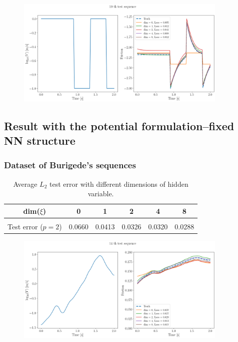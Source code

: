 \begin{figure}[H]
    \centering
    \includegraphics[width=0.9\textwidth]{images/FGJump2.png}
    \label{fig:FGJump2}
\end{figure}

\newpage
\subsection{Result with the potential formulation--fixed NN structure}
\subsubsection{Dataset of Burigede's sequences}
\begin{table}[H]
    \centering
    \begin{tabular}{c|ccccc}
        \hline
        dim($\xi$) & 0 & 1 & 2 & 4 & 8 \\
        \hline \\[-1em]
        Test error ($p=2$) & 0.0660 & 0.0413 & 0.0326 & 0.0320 & 0.0288\\
        \hline
    \end{tabular}
    \caption{Average $L_2$ test error with different dimensions of hidden variable.}
    \label{tab:resDtTsqBurigedeFixed}
\end{table}

\begin{figure}[H]
    \centering
    \includegraphics[width=0.9\textwidth]{images/dtTSqBurigede1_fixed.png}
    \label{fig:dtTSqBurigede1Fixed}
\end{figure}

